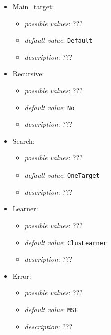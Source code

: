 \documentclass{article}
\begin{document}
\begin{itemize}
    \item Main_target:
           \begin{itemize}
                \item \emph{possible values}: ???
                \item \emph{default value}: \texttt{Default}
                \item \emph{description}: ???
           \end{itemize}
    \item Recursive:
           \begin{itemize}
                \item \emph{possible values}: ???
                \item \emph{default value}: \texttt{No}
                \item \emph{description}: ???
           \end{itemize}
    \item Search:
           \begin{itemize}
                \item \emph{possible values}: ???
                \item \emph{default value}: \texttt{OneTarget}
                \item \emph{description}: ???
           \end{itemize}
    \item Learner:
           \begin{itemize}
                \item \emph{possible values}: ???
                \item \emph{default value}: \texttt{ClusLearner}
                \item \emph{description}: ???
           \end{itemize}
    \item Error:
           \begin{itemize}
                \item \emph{possible values}: ???
                \item \emph{default value}: \texttt{MSE}
                \item \emph{description}: ???
           \end{itemize}
\end{itemize}
\end{document}

